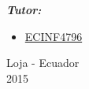 \documentclass{article}
\begin{document}
{\begin{flushleft}
\begin{flushleft}
\bigskip
\bigskip
\end{flushleft}
\thinspace
\bigskip
\begin{flushleft}
\textit{\textbf{Tutor:}}

\begin{itemize}
\renewcommand{\labelitemi}{$\diamond$} 
\item \href{http://www.iralis.org/?q=node%2F10&paso=10&letra=O&id=4796}{ECINF4796}
\end{itemize}
\bigskip
\bigskip
\end{flushleft}
\thinspace
\bigskip

\begin{center}
Loja - Ecuador \\
2015
\end{center}


\newpage


\end{flushleft}}
\end{document}
